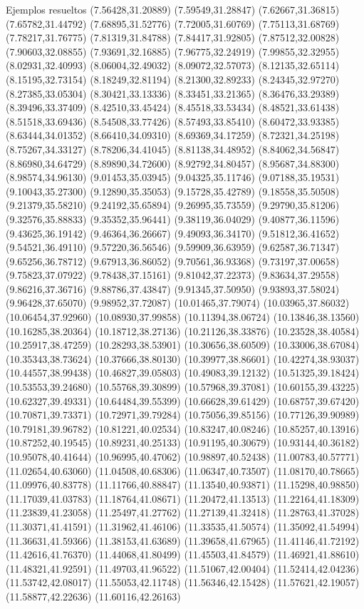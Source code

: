 \documentclass[11pt,a4paper]{article}
\begin{document}
\begin{fmex}{Ejemplos resueltos}
(7.56428,31.20889) (7.59549,31.28847) (7.62667,31.36815) (7.65782,31.44792) (7.68895,31.52776) (7.72005,31.60769) (7.75113,31.68769) (7.78217,31.76775) (7.81319,31.84788) (7.84417,31.92805) (7.87512,32.00828) (7.90603,32.08855) (7.93691,32.16885) (7.96775,32.24919) (7.99855,32.32955) (8.02931,32.40993) (8.06004,32.49032) (8.09072,32.57073) (8.12135,32.65114) (8.15195,32.73154) (8.18249,32.81194) (8.21300,32.89233) (8.24345,32.97270) (8.27385,33.05304) (8.30421,33.13336) (8.33451,33.21365) (8.36476,33.29389) (8.39496,33.37409) (8.42510,33.45424) (8.45518,33.53434) (8.48521,33.61438) (8.51518,33.69436) (8.54508,33.77426) (8.57493,33.85410) (8.60472,33.93385) (8.63444,34.01352) (8.66410,34.09310) (8.69369,34.17259) (8.72321,34.25198) (8.75267,34.33127) (8.78206,34.41045) (8.81138,34.48952) (8.84062,34.56847) (8.86980,34.64729) (8.89890,34.72600) (8.92792,34.80457) (8.95687,34.88300) (8.98574,34.96130) (9.01453,35.03945) (9.04325,35.11746) (9.07188,35.19531) (9.10043,35.27300) (9.12890,35.35053) (9.15728,35.42789) (9.18558,35.50508) (9.21379,35.58210) (9.24192,35.65894) (9.26995,35.73559) (9.29790,35.81206) (9.32576,35.88833) (9.35352,35.96441) (9.38119,36.04029) (9.40877,36.11596) (9.43625,36.19142) (9.46364,36.26667) (9.49093,36.34170) (9.51812,36.41652) (9.54521,36.49110) (9.57220,36.56546) (9.59909,36.63959) (9.62587,36.71347) (9.65256,36.78712) (9.67913,36.86052) (9.70561,36.93368) (9.73197,37.00658) (9.75823,37.07922) (9.78438,37.15161) (9.81042,37.22373) (9.83634,37.29558) (9.86216,37.36716) (9.88786,37.43847) (9.91345,37.50950) (9.93893,37.58024) (9.96428,37.65070) (9.98952,37.72087) (10.01465,37.79074) (10.03965,37.86032) (10.06454,37.92960) (10.08930,37.99858) (10.11394,38.06724) (10.13846,38.13560) (10.16285,38.20364) (10.18712,38.27136) (10.21126,38.33876) (10.23528,38.40584) (10.25917,38.47259) (10.28293,38.53901) (10.30656,38.60509) (10.33006,38.67084) (10.35343,38.73624) (10.37666,38.80130) (10.39977,38.86601) (10.42274,38.93037) (10.44557,38.99438) (10.46827,39.05803) (10.49083,39.12132) (10.51325,39.18424) (10.53553,39.24680) (10.55768,39.30899) (10.57968,39.37081) (10.60155,39.43225) (10.62327,39.49331) (10.64484,39.55399) (10.66628,39.61429) (10.68757,39.67420) (10.70871,39.73371) (10.72971,39.79284) (10.75056,39.85156) (10.77126,39.90989) (10.79181,39.96782) (10.81221,40.02534) (10.83247,40.08246) (10.85257,40.13916) (10.87252,40.19545) (10.89231,40.25133) (10.91195,40.30679) (10.93144,40.36182) (10.95078,40.41644) (10.96995,40.47062) (10.98897,40.52438) (11.00783,40.57771) (11.02654,40.63060) (11.04508,40.68306) (11.06347,40.73507) (11.08170,40.78665) (11.09976,40.83778) (11.11766,40.88847) (11.13540,40.93871) (11.15298,40.98850) (11.17039,41.03783) (11.18764,41.08671) (11.20472,41.13513) (11.22164,41.18309) (11.23839,41.23058) (11.25497,41.27762) (11.27139,41.32418) (11.28763,41.37028) (11.30371,41.41591) (11.31962,41.46106) (11.33535,41.50574) (11.35092,41.54994) (11.36631,41.59366) (11.38153,41.63689) (11.39658,41.67965) (11.41146,41.72192) (11.42616,41.76370) (11.44068,41.80499) (11.45503,41.84579) (11.46921,41.88610) (11.48321,41.92591) (11.49703,41.96522) (11.51067,42.00404) (11.52414,42.04236) (11.53742,42.08017) (11.55053,42.11748) (11.56346,42.15428) (11.57621,42.19057) (11.58877,42.22636) (11.60116,42.26163) 
\end{fmex}
\end{document}
